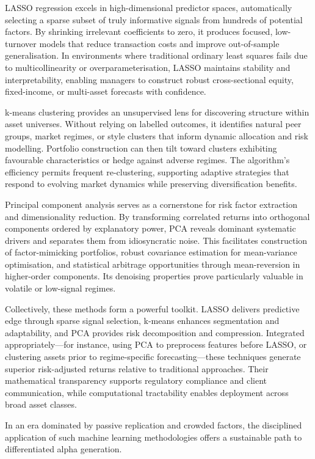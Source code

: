 \documentclass[11pt,a4paper]{article}
\begin{document}
LASSO regression excels in high-dimensional predictor spaces, automatically selecting a sparse subset of truly informative signals from hundreds of potential factors. By shrinking irrelevant coefficients to zero, it produces focused, low-turnover models that reduce transaction costs and improve out-of-sample generalisation. In environments where traditional ordinary least squares fails due to multicollinearity or overparameterisation, LASSO maintains stability and interpretability, enabling managers to construct robust cross-sectional equity, fixed-income, or multi-asset forecasts with confidence.

k-means clustering provides an unsupervised lens for discovering structure within asset universes. Without relying on labelled outcomes, it identifies natural peer groups, market regimes, or style clusters that inform dynamic allocation and risk modelling. Portfolio construction can then tilt toward clusters exhibiting favourable characteristics or hedge against adverse regimes. The algorithm’s efficiency permits frequent re-clustering, supporting adaptive strategies that respond to evolving market dynamics while preserving diversification benefits.

Principal component analysis serves as a cornerstone for risk factor extraction and dimensionality reduction. By transforming correlated returns into orthogonal components ordered by explanatory power, PCA reveals dominant systematic drivers and separates them from idiosyncratic noise. This facilitates construction of factor-mimicking portfolios, robust covariance estimation for mean-variance optimisation, and statistical arbitrage opportunities through mean-reversion in higher-order components. Its denoising properties prove particularly valuable in volatile or low-signal regimes.

Collectively, these methods form a powerful toolkit. LASSO delivers predictive edge through sparse signal selection, k-means enhances segmentation and adaptability, and PCA provides risk decomposition and compression. Integrated appropriately—for instance, using PCA to preprocess features before LASSO, or clustering assets prior to regime-specific forecasting—these techniques generate superior risk-adjusted returns relative to traditional approaches. Their mathematical transparency supports regulatory compliance and client communication, while computational tractability enables deployment across broad asset classes.

In an era dominated by passive replication and crowded factors, the disciplined application of such machine learning methodologies offers a sustainable path to differentiated alpha generation.
\end{document}
